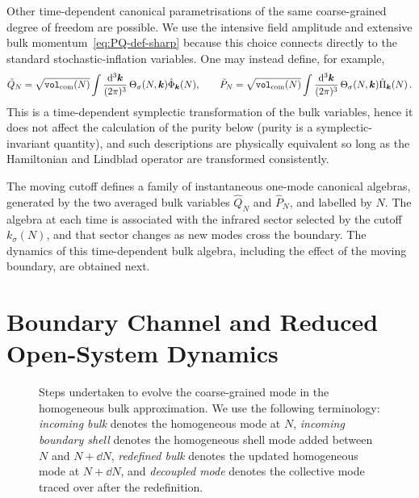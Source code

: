 \documentclass{article}
\newcommand{\VF}{\mathtt{vol}_{\rm com}}
\newcommand{\hvarphi}{\hat{\Phi}}
\newcommand{\hpi}{\hat{\Pi}}
\numberwithin{equation}{section}
\begin{document}
	Other time-dependent canonical parametrisations of the same coarse-grained degree of freedom are possible. We use the intensive field amplitude and extensive bulk momentum~\eqref{eq:PQ-def-sharp} because this choice connects directly to the standard stochastic-inflation variables. One may instead define, for example, 
\begin{equation}
\tilde Q_N = \sqrt{\VF(N)} \int \frac{\dd ^3\bm{k}}{(2\pi)^3} \, \Theta_\sigma(N,\bm k)\hvarphi_{\bm k}(N), \qquad \tilde P_N = \sqrt{\VF(N)} \int \frac{\dd^3\bm{k}}{(2\pi)^3} \, \Theta_\sigma(N,\bm k)\hpi_{\bm k}(N)\, . 
\end{equation}
This is a time-dependent symplectic transformation of the bulk variables, hence it does not affect the calculation of the purity below (purity is a symplectic-invariant quantity), and such descriptions are physically equivalent so long as the Hamiltonian and Lindblad operator are transformed consistently.

	The moving cutoff defines a family of instantaneous one-mode canonical algebras, generated by the two averaged bulk variables $\hat Q_N$ and $\hat P_N$, and labelled by \(N\). The algebra at each time is associated with the infrared sector selected by the cutoff \(k_\sigma(N)\), and that sector changes as new modes cross the boundary. The dynamics of this time-dependent bulk algebra, including the effect of the moving boundary, are obtained next.

	\section{Boundary Channel and Reduced Open-System Dynamics}
	\label{sec:boundary_fluctuations}

	\begin{figure}[ht]
		\begin{center}
			
			\caption{\small Steps undertaken to evolve the coarse-grained mode in the homogeneous bulk approximation. We use the following terminology: \textit{incoming bulk} denotes the homogeneous mode at \(N\), \textit{incoming boundary shell} denotes the homogeneous shell mode added between \(N\) and \(N+\dd N\), \textit{redefined bulk} denotes the updated homogeneous mode at \(N+\dd N\), and \textit{decoupled mode} denotes the collective mode traced over after the redefinition.
            }
		\label{fig:bulk_boundary}
		\end{center}
	\end{figure}
\end{document}
